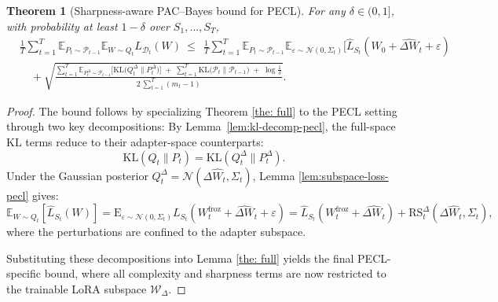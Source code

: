\documentclass{article}
\theoremstyle{plain}
\newtheorem{theorem}{Theorem}[section]
\theoremstyle{definition}
\theoremstyle{remark}
\begin{document}
\begin{theorem}[Sharpness-aware PAC--Bayes bound for PECL]

For any $\delta\in(0,1]$, with probability at least $1-\delta$ over $S_1,\ldots,S_T$,
\begin{equation}\label{eq:pecl-main}
\begin{aligned}
&\frac{1}{T}\sum_{t=1}^T
\mathbb{E}_{P_t\sim\mathcal P_{t-1}}\mathbb{E}_{W\sim Q_t}L_{\mathcal{D}_t}(W)
\ \le\
\ \frac{1}{T}\sum_{t=1}^T
\mathbb{E}_{P_t\sim\mathcal P_{t-1}}
\mathbb{E}_{\varepsilon \sim \mathcal{N}(0, \Sigma_t)}[\hat{L}_{S_t}(W_0 + \widehat{\Delta W}_t + \varepsilon)
\\
&\quad +\sqrt{\frac{
\displaystyle \sum_{t=1}^T \mathbb{E}_{P_t^\Delta\sim\mathcal P_{t-1}}\!\Big[\mathrm{KL}\!\big(Q_t^\Delta\|P_t^\Delta\big)\Big]
\;+\;\displaystyle \sum_{t=1}^T \mathrm{KL}\!\big(\mathcal P_t\|\mathcal P_{t-1}\big)
\;+\;\log\!\frac{1}{\delta}
}{2\,\displaystyle\sum_{t=1}^T (m_t-1)}}.
\end{aligned}
\end{equation}
\end{theorem}



\begin{proof}
The bound follows by specializing Theorem \ref{the: full} to the PECL setting through two key decompositions:
By Lemma~\ref{lem:kl-decomp-pecl}, the full-space KL terms reduce to their adapter-space counterparts:
\[
\mathrm{KL}(Q_t \| P_t) = \mathrm{KL}(Q_t^\Delta \| P_t^\Delta).
\]
Under the Gaussian posterior $Q_t^\Delta = \mathcal{N}(\Delta\hat{W}_t, \Sigma_t)$, Lemma \ref{lem:subspace-loss-pecl} gives:
\[
\mathbb{E}_{W \sim Q_t}[\hat{L}_{S_t}(W)] 
= \mathrm{E}_{\varepsilon \sim \mathcal{N}(0, \Sigma_t)}{L}_{S_t}(W^{\mathrm{froz}}_t+\widehat{\Delta W}_t + \varepsilon)
 = \hat{L}_{S_t}(W^{\mathrm{froz}}_t + \widehat{\Delta{W}_t}) + \mathrm{RS}_t^\Delta(\Delta\widehat{W}_t, \Sigma_t),
\]
where the perturbations are confined to the adapter subspace.

Substituting these decompositions into Lemma \ref{the: full} yields the final PECL-specific bound, where all complexity and sharpness terms are now restricted to the trainable LoRA subspace $\mathcal{W}_\Delta$.

\end{proof}
\end{document}
